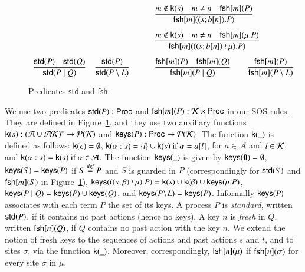 {\begin{figure}[t]
\[\begin{array}{ll}
\qquad &
\Rule
{m \notin \kkey{s} \quad m \neq n \quad \fresh{m}{P}}
{\fresh{m}{(s;b[n]).P}}
\\[15pt]
%
&
\Rule
{m \notin \kkey{s} \quad m \neq n \quad \fresh{m}{\mu.P}}
{\fresh{m}{((s;b[n])\wr \mu).P}}
\\[15pt]
\Rule
{\std{P} \quad \std{Q}}
{\std{P \paral Q}}\quad 
\Rule
{\std{P}}
{\std{P \setminus L}}
\qquad &
\Rule
{\fresh{m}{P} \quad \fresh{m}{Q}}
{\fresh{m}{P \paral Q}}
\qquad 
\Rule
{\fresh{m}{P}}
{\fresh{m}{P \setminus L}}
\end{array}
\] 
\caption{Predicates $\mathsf{std}$ and $\mathsf{fsh}$.} 
\label{fig:predicates}
\end{figure}
%
%
We use two predicates $\mathsf{std}(P):\mathsf{Proc}$ and $\mathsf{fsh}[m](P):\mathcal{K} \times \mathsf{Proc}$ in our SOS rules. 
They are defined in Figure~\ref{fig:predicates}, and they use two auxiliary functions
$\mathsf{k}(s): (\mathcal{A}\cup\mathcal{AK})^* \rightarrow \mathcal{P}(\mathcal{K})$ and
$\mathsf{keys}(P): \mathsf{Proc} \rightarrow \mathcal{P}(\mathcal{K})$. 
%
The function $\mathsf{k}(\_)$ is defined as follows:
$\mathsf{k}(\epsilon)=\emptyset$, $\mathsf{k}(\alpha:s)=\{l\}\cup\mathsf{k}(s) \text{ if }\alpha=a[l]$, for 
$a\in \mathcal{A}$ and $l\in \mathcal{K}$, and $\mathsf{k}(\alpha:s)= \mathsf{k}(s) \text{ if }\alpha \in \mathcal{A}$.
%
The function $\mathsf{keys}(\_)$ is given by $\mathsf{keys}(\mathbf{0})=\emptyset$, $\mathsf{keys}(S)=\mathsf{keys}(P)$ if $S\stackrel{\emph{def}}{=} P$ and $S$ is guarded in $P$
(correspondingly for $\mathsf{std}(S)$ and $\mathsf{fsh}[m](S)$ in Figure~\ref{fig:predicates}), 
$\mathsf{keys}(((s;\beta)\wr \mu).P)=\mathsf{k}(s) \cup \mathsf{k}(\beta) \cup \mathsf{keys}(\mu.P)$, $\mathsf{keys}(P \; \vert \; Q)= \mathsf{keys}(P) \cup \mathsf{keys}(Q)$, and $\mathsf{keys}(P \!\setminus\!L)=\mathsf{keys}(P)$. Informally $\mathsf{keys}(P)$ associates with each term $P$ the set of its keys. 
A process $P$ is \emph{standard}, written $\mathsf{std}(P)$, if it contains no past actions (hence no keys). 
A key $n$ is \emph{fresh} in $Q$, written $\mathsf{fsh}[n](Q)$, if $Q$ contains no past action with the key $n$.
We extend the notion of fresh keys to the sequences of actions and past actions $s$ and $t$, and to sites $\sigma$, 
via the function $\mathsf{k}(\_)$. Moreover, correspondingly, $\mathsf{fsh}[n](\mu)$ if $\mathsf{fsh}[n](\sigma)$ for every
site $\sigma$ in $\mu$. 

}
